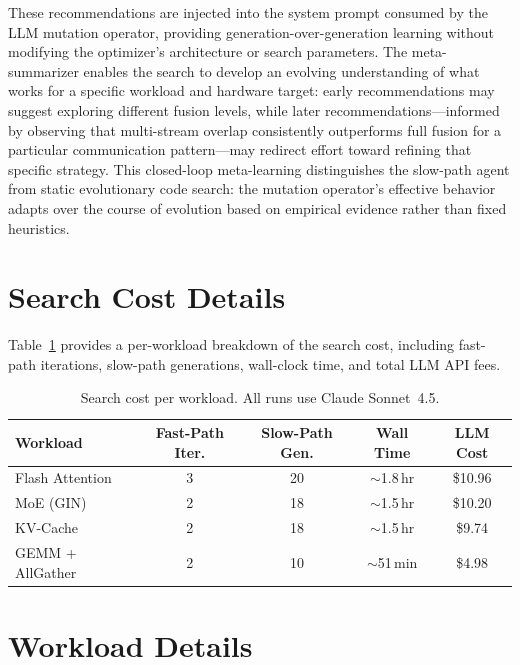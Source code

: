 These recommendations are injected into the system prompt consumed by the LLM mutation operator, providing generation-over-generation learning without modifying the optimizer's architecture or search parameters. The meta-summarizer enables the search to develop an evolving understanding of what works for a specific workload and hardware target: early recommendations may suggest exploring different fusion levels, while later recommendations---informed by observing that multi-stream overlap consistently outperforms full fusion for a particular communication pattern---may redirect effort toward refining that specific strategy. This closed-loop meta-learning distinguishes the slow-path agent from static evolutionary code search: the mutation operator's effective behavior adapts over the course of evolution based on empirical evidence rather than fixed heuristics.

\section{Search Cost Details}\label{sec:search-cost-details}

Table~\ref{tab:search-cost} provides a per-workload breakdown of the search cost, including fast-path iterations, slow-path generations, wall-clock time, and total LLM API fees.

\begin{table}[h]
\centering
\scriptsize
\setlength{\tabcolsep}{5pt}
\caption{Search cost per workload. All runs use Claude Sonnet~4.5.}
\label{tab:search-cost}
\begin{tabular}{lcccc}
\toprule
\textbf{Workload} & \textbf{Fast-Path Iter.} & \textbf{Slow-Path Gen.} & \textbf{Wall Time} & \textbf{LLM Cost} \\
\midrule
Flash Attention   & 3 & 20 & ${\sim}$1.8\,hr & \$10.96 \\
MoE (GIN)        & 2 & 18 & ${\sim}$1.5\,hr & \$10.20 \\
KV-Cache         & 2 & 18 & ${\sim}$1.5\,hr & \$9.74 \\
GEMM + AllGather & 2 & 10 & ${\sim}$51\,min & \$4.98 \\
\bottomrule
\end{tabular}
\end{table}

\section{Workload Details}\label{sec:workload_details}

